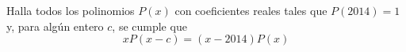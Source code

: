 Halla todos los polinomios $P(x)$ con coeficientes reales tales que $P(2014) = 1$ y, para algún entero $c$, se cumple que
\[ x P(x-c) = (x-2014)P(x) \]
